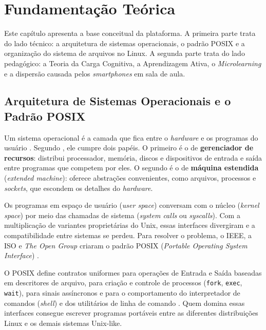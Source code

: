 \chapter{Fundamentação Teórica}
\label{cap:fundamentacao}

Este capítulo apresenta a base conceitual da plataforma. A primeira parte trata do lado técnico: a arquitetura de sistemas operacionais, o padrão POSIX e a organização do sistema de arquivos no Linux. A segunda parte trata do lado pedagógico: a Teoria da Carga Cognitiva, a Aprendizagem Ativa, o \textit{Microlearning} e a dispersão causada pelos \textit{smartphones} em sala de aula.

\section{Arquitetura de Sistemas Operacionais e o Padrão POSIX}
\label{sec:posix}

Um sistema operacional é a camada que fica entre o \textit{hardware} e os programas do usuário \cite{silberschatz2018operating, tanenbaum2015modern}. Segundo , ele cumpre dois papéis. O primeiro é o de \textbf{gerenciador de recursos}: distribui processador, memória, discos e dispositivos de entrada e saída entre programas que competem por eles. O segundo é o de \textbf{máquina estendida} (\textit{extended machine}): oferece abstrações convenientes, como arquivos, processos e \textit{sockets}, que escondem os detalhes do \textit{hardware}.

Os programas em espaço de usuário (\textit{user space}) conversam com o núcleo (\textit{kernel space}) por meio das chamadas de sistema (\textit{system calls} ou \textit{syscalls}). Com a multiplicação de variantes proprietárias do Unix, essas interfaces divergiram e a compatibilidade entre sistemas se perdeu. Para resolver o problema, o IEEE, a ISO e \textit{The Open Group} criaram o padrão POSIX (\textit{Portable Operating System Interface}) \cite{posix2018}.

O POSIX define contratos uniformes para operações de Entrada e Saída baseadas em descritores de arquivo, para criação e controle de processos (\texttt{fork}, \texttt{exec}, \texttt{wait}), para sinais assíncronos e para o comportamento do interpretador de comandos (\textit{shell}) e dos utilitários de linha de comando \cite{kerrisk2010linux}. Quem domina essas interfaces consegue escrever programas portáveis entre as diferentes distribuições Linux e os demais sistemas Unix-like.

